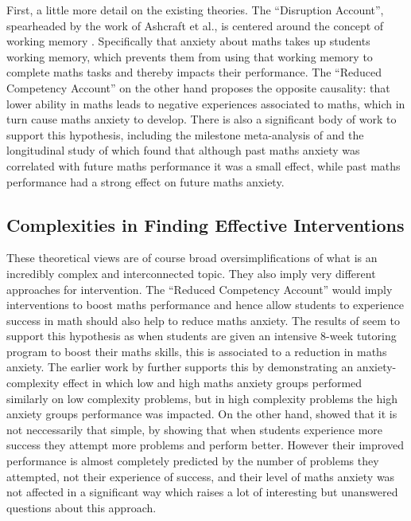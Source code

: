 \documentclass[twoside,12pt,a4paper]{report}
\begin{document}
First, a little more detail on the existing theories. The ``Disruption Account'', spearheaded by the work of Ashcraft et al., is centered around the concept of working memory \cite{Ashcraft2001, Ashcraft2007}. Specifically that anxiety about maths takes up students working memory, which prevents them from using that working memory to complete maths tasks and thereby impacts their performance. The ``Reduced Competency Account'' on the other hand proposes the opposite causality: that lower ability in maths leads to negative experiences associated to maths, which in turn cause maths anxiety to develop. There is also a significant body of work to support this hypothesis, including the milestone meta-analysis of  and the longitudinal study of  which found that although past maths anxiety was correlated with future maths performance it was a small effect, while past maths performance had a strong effect on future maths anxiety.



\subsection*{Complexities in Finding Effective Interventions}

These theoretical views are of course broad oversimplifications of what is an incredibly complex and interconnected topic. They also imply very different approaches for intervention. The ``Reduced Competency Account'' would imply interventions to boost maths performance and hence allow students to experience success in math should also help to reduce maths anxiety. The results of   seem to support this hypothesis as when students are given an intensive 8-week tutoring program to boost their maths skills, this is associated to a reduction in maths anxiety. The earlier work by  further supports this by demonstrating an anxiety-complexity effect in which low and high maths anxiety groups performed similarly on low complexity problems, but in high complexity problems the high anxiety groups performance was impacted. On the other hand,  showed that it is not neccessarily that simple, by showing that when students experience more success they attempt more problems and perform better. However their improved performance is almost completely predicted by the number of problems they attempted, not their experience of success, and their level of maths anxiety was not affected in a significant way which raises a lot of interesting but unanswered questions about this approach. 
	
\end{document}
